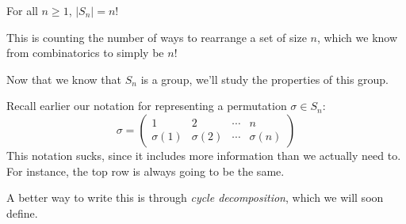    \begin{proposition}
        For all $n \ge 1$, $|S_n| = n!$ 
    \end{proposition}

    \begin{prf}
        This is counting the number of ways to rearrange a set of size
        $n$, which we know from combinatorics to simply be $n!$
    \end{prf}

    Now that we know that $S_n$ is a group, we'll study the properties
    of this group. 

    Recall earlier our notation for representing a permutation $\sigma
    \in S_n$:
    \[
       \sigma =  
       \begin{pmatrix}
            1 & 2 & \cdots & n\\
            \sigma(1) & \sigma(2) & \cdots & \sigma(n)
         \end{pmatrix}
    \]
    This notation sucks, since it includes more information than we
    actually need to. For instance, the top row is always going to be
    the same. 
    
    A better way to write this is through
    \textit{cycle decomposition}, which we will soon define.

